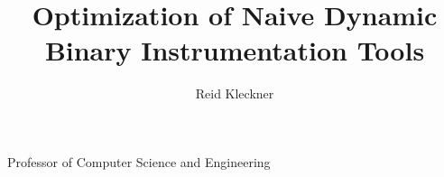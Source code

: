 \documentclass[twoside,leftblank,mitcopyright]{mengthesis}
\begin{document}


\title{Optimization of Naive Dynamic Binary Instrumentation Tools}


\author{Reid Kleckner}







           {Professor of Computer Science and Engineering}



\maketitle


\end{document}
